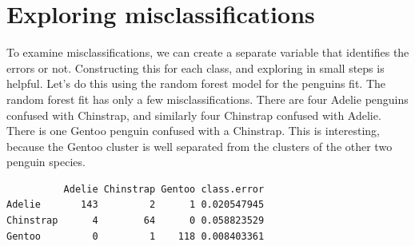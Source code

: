 \documentclass[
  letterpaper,
]{krantz}
\newenvironment{Shaded}{\begin{snugshade}}{\end{snugshade}}
\newcommand{\AttributeTok}[1]{\textcolor[rgb]{0.40,0.45,0.13}{#1}}
\newcommand{\DecValTok}[1]{\textcolor[rgb]{0.68,0.00,0.00}{#1}}
\newcommand{\FunctionTok}[1]{\textcolor[rgb]{0.28,0.35,0.67}{#1}}
\newcommand{\NormalTok}[1]{\textcolor[rgb]{0.00,0.23,0.31}{#1}}
\newcommand{\OtherTok}[1]{\textcolor[rgb]{0.00,0.23,0.31}{#1}}
\newcommand{\SpecialCharTok}[1]{\textcolor[rgb]{0.37,0.37,0.37}{#1}}
\begin{document}
\hypertarget{exploring-misclassifications}{%
\chapter{Exploring
misclassifications}\label{exploring-misclassifications}}


To examine misclassifications, we can create a separate variable that
identifies the errors or not. Constructing this for each class, and
exploring in small steps is helpful. Let's do this using the random
forest model for the penguins fit. The random forest fit has only a few
misclassifications. There are four Adelie penguins confused with
Chinstrap, and similarly four Chinstrap confused with Adelie. There is
one Gentoo penguin confused with a Chinstrap. This is interesting,
because the Gentoo cluster is well separated from the clusters of the
other two penguin species.


\begin{Shaded}
\end{Shaded}

\begin{verbatim}
          Adelie Chinstrap Gentoo class.error
Adelie       143         2      1 0.020547945
Chinstrap      4        64      0 0.058823529
Gentoo         0         1    118 0.008403361
\end{verbatim}

\begin{Shaded}
\end{Shaded}
\end{document}
